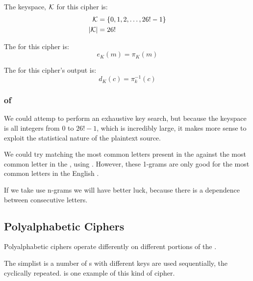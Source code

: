 The keyspace, $\operatorname{\mathcal{K}}$ for this cipher is:
\begin{equation*}
  \begin{aligned}
    \operatorname{\mathcal{K}} &= \lbrace 0, 1, 2, \ldots, 26!-1 \rbrace \\
    \lvert \operatorname{\mathcal{K}} \rvert &= 26!
  \end{aligned}
\end{equation*}

The  for this cipher is:
\begin{equation}\label{eq:Simple_Substitution_Cipher-Encryption}
  e_{K}(m) = \pi_{K}(m)
\end{equation}

The  for this cipher's output is:
\begin{equation}\label{eq:Simple_Substitution_Cipher-Decryption}
  d_{K}(c) = \pi_{k}^{-1}(c)
\end{equation}

\subsubsection{ of }\label{subsubsec:Cryptanalysis_Simple_Substitution_Cipher}
We could attemp to perform an exhaustive key search, but because the keyspace is all integers from 0 to $26!-1$, which is incredibly large, it makes more sense to exploit the statistical nature of the plaintext source.

We could try matching the most common letters present in the  against the most common letter in the  , using .
However, these 1-grams are only good for the most common letters in the English .

If we take use n-grams we will have better luck, because there is a dependence between consecutive letters.

\subsection{Polyalphabetic Ciphers}\label{subsec:Polyalphabetic_Ciphers}
Polyalphabetic ciphers operate differently on different portions of the .

The simplist  is a number of s with different keys are used sequentially, the cyclically repeated.
 is one example of this kind of cipher.

